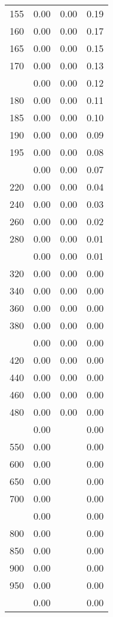 \begin{table}[ht]
\begin{tabular}{lccc}
  155 & 0.00 & 0.00 & 0.19 \\ 
  160 & 0.00 & 0.00 & 0.17 \\ 
  165 & 0.00 & 0.00 & 0.15 \\ 
  170 & 0.00 & 0.00 & 0.13 \\ 
   \addlinespace
175 & 0.00 & 0.00 & 0.12 \\ 
  180 & 0.00 & 0.00 & 0.11 \\ 
  185 & 0.00 & 0.00 & 0.10 \\ 
  190 & 0.00 & 0.00 & 0.09 \\ 
  195 & 0.00 & 0.00 & 0.08 \\ 
   \addlinespace
200 & 0.00 & 0.00 & 0.07 \\ 
  220 & 0.00 & 0.00 & 0.04 \\ 
  240 & 0.00 & 0.00 & 0.03 \\ 
  260 & 0.00 & 0.00 & 0.02 \\ 
  280 & 0.00 & 0.00 & 0.01 \\ 
   \addlinespace
300 & 0.00 & 0.00 & 0.01 \\ 
  320 & 0.00 & 0.00 & 0.00 \\ 
  340 & 0.00 & 0.00 & 0.00 \\ 
  360 & 0.00 & 0.00 & 0.00 \\ 
  380 & 0.00 & 0.00 & 0.00 \\ 
   \addlinespace
400 & 0.00 & 0.00 & 0.00 \\ 
  420 & 0.00 & 0.00 & 0.00 \\ 
  440 & 0.00 & 0.00 & 0.00 \\ 
  460 & 0.00 & 0.00 & 0.00 \\ 
  480 & 0.00 & 0.00 & 0.00 \\ 
   \addlinespace
500 & 0.00 &  & 0.00 \\ 
  550 & 0.00 &  & 0.00 \\ 
  600 & 0.00 &  & 0.00 \\ 
  650 & 0.00 &  & 0.00 \\ 
  700 & 0.00 &  & 0.00 \\ 
   \addlinespace
750 & 0.00 &  & 0.00 \\ 
  800 & 0.00 &  & 0.00 \\ 
  850 & 0.00 &  & 0.00 \\ 
  900 & 0.00 &  & 0.00 \\ 
  950 & 0.00 &  & 0.00 \\ 
   \addlinespace
1000 & 0.00 &  & 0.00 \\ 
   \bottomrule
\end{tabular}
\end{table}
